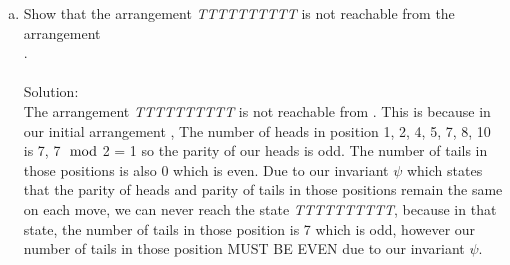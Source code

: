\documentclass{article}
\newcommand*\moveToRight[1]{\hspace*{0em plus 1fill}\makebox{(#1)}}
\begin{document}
\begin{enumerate}[(a)]
    \item Show that the arrangement \textit{TTTTTTTTTT} is not reachable from the arrangement \\. \moveToRight{2 marks}\\\\
    Solution:\\
    The arrangement \textit{TTTTTTTTTT} is not reachable from . This is because in our initial arrangement , The number of heads in position 1, 2, 4, 5, 7, 8, 10 is 7, 7$\mod$2 = 1 so the parity of our heads is odd. The number of tails in those positions is also 0 which is even. Due to our invariant $\psi$ which states that the parity of heads and parity of tails in those positions remain the same on each move, we can never reach the state \textit{TTTTTTTTTT}, because in that state, the number of tails in those position is 7 which is odd, however our number of tails in those position MUST BE EVEN due to our invariant $\psi$.
\end{enumerate}

\newpage
\end{document}
